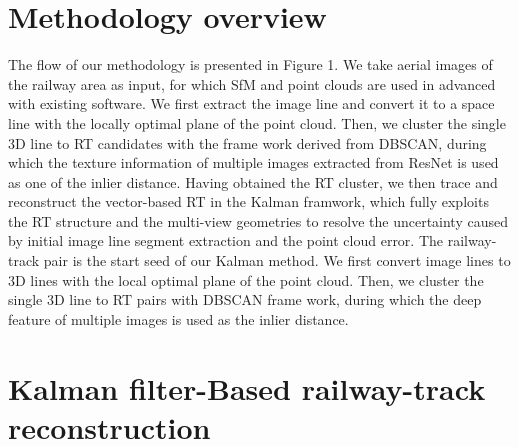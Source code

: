 \section{Methodology overview}

The flow of our methodology is presented in Figure 1.
We take aerial images of the railway area as input,
for which SfM and point clouds are used in advanced with existing software.
We first extract the image line and convert it to a space line with the locally optimal plane of the point cloud.
Then,
we cluster the single 3D line to RT candidates with the frame work derived from DBSCAN,  
during which the texture information of multiple images extracted from ResNet is used as one of the inlier distance.
Having obtained the RT cluster, 
we then trace and reconstruct the vector-based RT in the Kalman framwork,
which fully exploits the RT structure and the multi-view geometries to resolve the uncertainty caused by initial image line segment extraction and the point cloud error.
The railway-track pair is the start seed of our Kalman method.
We first convert image lines to 3D lines with the local optimal plane of the point cloud.
Then,
we cluster the single 3D line to RT pairs with DBSCAN frame work,  
during which the deep feature of multiple images is used as the inlier distance.





\section{Kalman filter-Based railway-track reconstruction}

